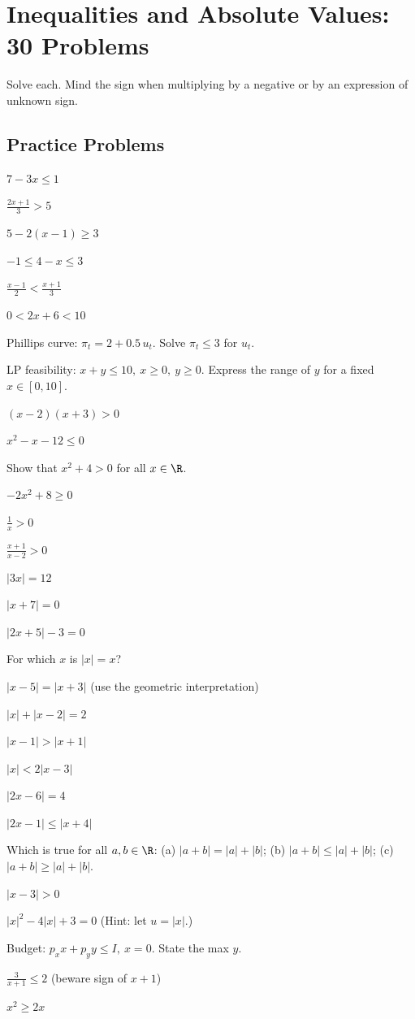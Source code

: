 \chapter{Inequalities and Absolute Values: 30 Problems}

Solve each. Mind the sign when multiplying by a negative or by an
expression of unknown sign.

\section{Practice Problems}

\begin{problems}
  \item $7-3x\le 1$
  \item $\displaystyle\frac{2x+1}{3}>5$
  \item $5-2(x-1)\ge 3$
  \item $-1\le 4-x\le 3$
  \item $\displaystyle\frac{x-1}{2}<\frac{x+1}{3}$
  \item $0<2x+6<10$
  \item Phillips curve: $\pi_{t}=2+0.5\,u_{t}$. Solve $\pi_{t}\le 3$ for
        $u_{t}$.
  \item LP feasibility: $x+y\le 10,\ x\ge 0,\ y\ge 0$. Express the range of
        $y$ for a fixed $x\in[0,10]$.
  \item $(x-2)(x+3)>0$
  \item $x^{2}-x-12\le 0$
  \item Show that $x^{2}+4>0$ for all $x\in\R$.
  \item $-2x^{2}+8\ge 0$
  \item $\displaystyle\frac{1}{x}>0$
  \item $\displaystyle\frac{x+1}{x-2}>0$
  \item $|3x|=12$
  \item $|x+7|=0$
  \item $|2x+5|-3=0$
  \item For which $x$ is $|x|=x$?
  \item $|x-5|=|x+3|$ (use the geometric interpretation)
  \item $|x|+|x-2|=2$
  \item $|x-1|>|x+1|$
  \item $|x|<2|x-3|$
  \item $|2x-6|=4$
  \item $|2x-1|\le|x+4|$
  \item Which is true for all $a,b\in\R$:
        (a) $|a+b|=|a|+|b|$;
        (b) $|a+b|\le|a|+|b|$;
        (c) $|a+b|\ge|a|+|b|$.
  \item $|x-3|>0$
  \item $|x|^{2}-4|x|+3=0$ (Hint: let $u=|x|$.)
  \item Budget: $p_{x}x+p_{y}y\le I,\ x=0$. State the max $y$.
  \item $\displaystyle\frac{3}{x+1}\le 2$ (beware sign of $x+1$)
  \item $x^{2}\ge 2x$
\end{problems}

